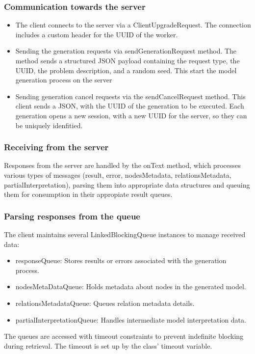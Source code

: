 			\subsubsection{Communication towards the server} 
				\begin{itemize}
					\item The client connects to the server via a ClientUpgradeRequest. The connection includes a custom header for the UUID of the worker.
					\item Sending the generation requests via sendGenerationRequest method. The method sends a structured JSON payload containing the request type,
					the UUID, the problem description, and a random seed. This start the model generation process on the server
					\item \label{clientcancel}Sending generation cancel requests via the sendCancelRequest method. This client sends a JSON, with the UUID of the generation to be 
					executed. Each generation opens a new session, with a new UUID for the server, so they can be uniquely idenfitied.
				\end{itemize} 
			\subsubsection{Receiving from the server} 
				Responses from the server are handled by the onText method, which processes various types of messages 
				(result, error, nodesMetadata, relationsMetadata, partialInterpretation), parsing them into appropriate data 
				structures and queuing them for consumption in their appropiate result queues.

			\subsubsection{Parsing responses from the queue} 
				The client maintains several LinkedBlockingQueue instances to manage received data:
				\begin{itemize}
					\item responseQueue: Stores results or errors associated with the generation process.
					\item nodesMetaDataQueue: Holds metadata about nodes in the generated model.
					\item relationsMetadataQueue: Queues relation metadata details.
					\item partialInterpretationQueue: Handles intermediate model interpretation data.
				\end{itemize} 
				The queues are accessed with timeout constraints to prevent indefinite blocking during retrieval. The timeout is set up by the class'
				timeout variable. 
				
